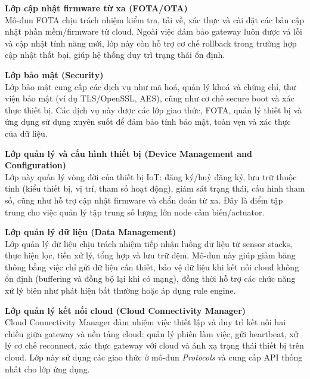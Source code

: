                     \textbf{Lớp cập nhật firmware từ xa (FOTA/OTA)}\\
                        Mô-đun FOTA chịu trách nhiệm kiểm tra, tải về, xác thực và cài đặt các bản cập nhật phần mềm/firmware từ cloud. Ngoài việc đảm bảo gateway luôn được vá lỗi và cập nhật tính năng mới, lớp này còn hỗ trợ cơ chế rollback trong trường hợp cập nhật thất bại, giúp hệ thống duy trì trạng thái ổn định.
                    
                    \textbf{Lớp bảo mật (Security)}\\
                        Lớp bảo mật cung cấp các dịch vụ như mã hoá, quản lý khoá và chứng chỉ, thư viện bảo mật (ví dụ TLS/OpenSSL, AES), cũng như cơ chế secure boot và xác thực thiết bị. Các dịch vụ này được các lớp giao thức, FOTA, quản lý thiết bị và ứng dụng sử dụng xuyên suốt để đảm bảo tính bảo mật, toàn vẹn và xác thực của dữ liệu.
                    
                    \textbf{Lớp quản lý và cấu hình thiết bị (Device Management and Configuration)}\\
                        Lớp này quản lý vòng đời của thiết bị IoT: đăng ký/huỷ đăng ký, lưu trữ thuộc tính (kiểu thiết bị, vị trí, tham số hoạt động), giám sát trạng thái, cấu hình tham số, cũng như hỗ trợ cập nhật firmware và chẩn đoán từ xa. Đây là điểm tập trung cho việc quản lý tập trung số lượng lớn node cảm biến/actuator.
                    
                    \textbf{Lớp quản lý dữ liệu (Data Management)}\\
                        Lớp quản lý dữ liệu chịu trách nhiệm tiếp nhận luồng dữ liệu từ sensor stacks, thực hiện lọc, tiền xử lý, tổng hợp và lưu trữ đệm. Mô-đun này giúp giảm băng thông bằng việc chỉ gửi dữ liệu cần thiết, bảo vệ dữ liệu khi kết nối cloud không ổn định (buffering và đồng bộ lại khi có mạng), đồng thời hỗ trợ các chức năng xử lý biên như phát hiện bất thường hoặc áp dụng rule engine.
                    
                    \textbf{Lớp quản lý kết nối cloud (Cloud Connectivity Manager)}\\
                        Cloud Connectivity Manager đảm nhiệm việc thiết lập và duy trì kết nối hai chiều giữa gateway và nền tảng cloud: quản lý phiên làm việc, gửi heartbeat, xử lý cơ chế reconnect, xác thực gateway với cloud và ánh xạ trạng thái thiết bị trên cloud. Lớp này sử dụng các giao thức ở mô-đun \emph{Protocols} và cung cấp API thống nhất cho lớp ứng dụng.
                    

